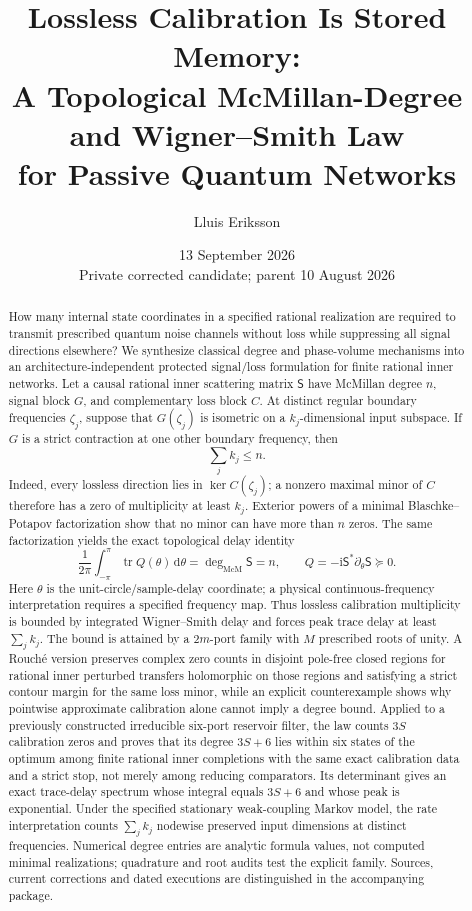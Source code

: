 \documentclass[11pt]{article}
\title{Lossless Calibration Is Stored Memory:\\
A Topological McMillan-Degree and Wigner--Smith Law\\
for Passive Quantum Networks}
\author{Lluis Eriksson}
\date{13 September 2026\\Private corrected candidate; parent 10 August 2026}
\theoremstyle{definition}
\theoremstyle{remark}
\newcommand{\tr}{\operatorname{tr}}
\newcommand{\dd}{\mathrm{d}}
\newcommand{\mcdeg}{\deg_{\mathrm{McM}}}
\begin{document}
\maketitle

\begin{abstract}
How many internal state coordinates in a specified rational realization
are required to transmit prescribed quantum
noise channels without loss while suppressing all signal directions
elsewhere? We synthesize classical degree and phase-volume mechanisms into
an architecture-independent protected signal/loss formulation for finite
rational inner networks.  Let a causal rational inner scattering matrix
$\mathsf S$ have McMillan degree $n$, signal block $G$, and complementary loss
block $C$.  At distinct regular boundary frequencies $\zeta_j$, suppose that
$G(\zeta_j)$ is isometric on a $k_j$-dimensional input subspace.  If $G$ is a
strict contraction at one other boundary frequency, then
\[
  \sum_j k_j\leq n.
\]
Indeed, every lossless direction lies in $\ker C(\zeta_j)$; a nonzero maximal
minor of $C$ therefore has a zero of multiplicity at least $k_j$.  Exterior
powers of a minimal Blaschke--Potapov factorization show that no minor can
have more than $n$ zeros.  The same factorization yields the exact topological
delay identity
\[
 \frac1{2\pi}\int_{-\pi}^{\pi}\tr Q(\theta)\,\dd\theta
 =\mcdeg\mathsf S=n,
 \qquad Q=-\mathrm{i}\mathsf S^*\partial_\theta\mathsf S\succeq0.
\]
Here $\theta$ is the unit-circle/sample-delay coordinate; a physical
continuous-frequency interpretation requires a specified frequency map.
Thus lossless calibration multiplicity is bounded by integrated
Wigner--Smith delay and forces peak trace delay at least $\sum_jk_j$.  The
bound is attained by a $2m$-port family with $M$ prescribed roots of unity.
A Rouch\'e version preserves complex zero counts in disjoint pole-free
closed regions for rational inner perturbed transfers holomorphic on those
regions and satisfying a strict contour margin for the same loss minor,
while an explicit counterexample shows why pointwise approximate calibration
alone cannot imply a degree bound.  Applied to a previously constructed
irreducible six-port reservoir filter, the law counts $3S$ calibration zeros
and proves that its degree $3S+6$ lies within six states of the optimum among
finite rational inner completions with the same exact calibration data and a
strict stop, not merely among reducing comparators.  Its determinant gives an
exact trace-delay spectrum whose integral equals $3S+6$ and whose peak is
exponential. Under the specified stationary weak-coupling Markov model,
the rate interpretation counts $\sum_j k_j$ nodewise preserved input
dimensions at distinct frequencies. Numerical degree entries are analytic
formula values, not computed minimal realizations; quadrature and root audits
test the explicit family. Sources, current corrections and dated executions
are distinguished in the accompanying package.
\end{abstract}
\end{document}
